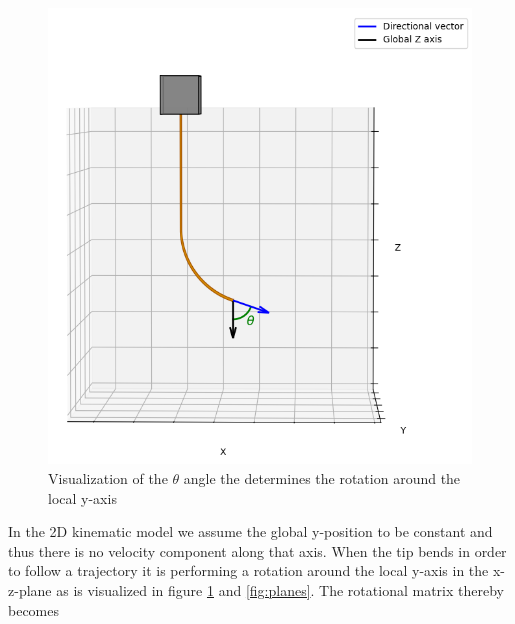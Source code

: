 \begin{figure} [H]
    \centering
    \includegraphics[width=0.55\linewidth]{images/pythonpictures/Capture.PNG}
    \caption{Visualization of the $\theta$ angle the determines the rotation around the local y-axis}
    \label{fig:theta}
\end{figure}

In the 2D kinematic model we assume the global y-position to be constant and thus there is no velocity component along that axis. When the tip bends in order to follow a trajectory it is performing a rotation around the local y-axis in the x-z-plane as is visualized in figure \ref{fig:theta} and \ref{fig:planes}. The rotational matrix thereby becomes

